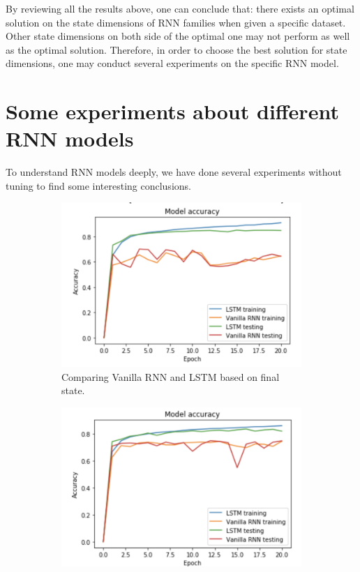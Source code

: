 \documentclass[12pt,letterpaper]{article}
\begin{document}
By reviewing all the results above, one can conclude that: there exists an optimal solution on the state dimensions of RNN families when given a specific dataset. Other state dimensions on both side of the optimal one may not perform as well as the optimal solution. Therefore, in order to choose the best solution for state dimensions, one may conduct several experiments on the specific RNN model.

\section{Some experiments about different RNN models}

To understand RNN models deeply, we have done several experiments without tuning to find some interesting conclusions.

\begin{figure}[h]
    \begin{subfigure}{0.49\textwidth}
    \includegraphics[width=\linewidth]{final_state_2_models.png}
    \caption{\small Comparing Vanilla RNN and LSTM based on final state.} \label{fig:e}
    \end{subfigure}\hspace*{\fill}
    \begin{subfigure}{0.49\textwidth}
    \includegraphics[width=\linewidth]{mean_pool_2_models.png}

\end{subfigure}
\end{figure}
\end{document}
